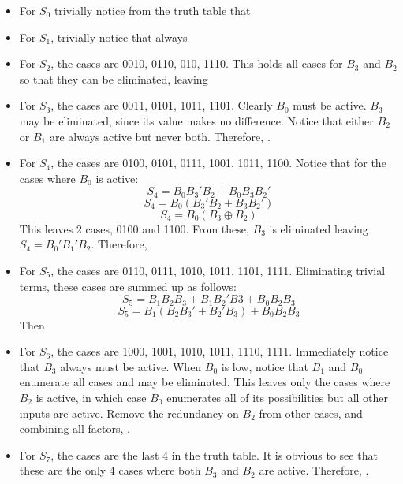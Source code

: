 \documentclass{article}
\begin{document}
\begin{enumerate}
        \begin{itemize}
            \item For $S_0$ trivially notice from the truth table that 
            \item For $S_1$, trivially notice that  always
            \item For $S_2$, the cases are 0010, 0110, 010, 1110. This holds all
            cases for $B_3$ and $B_2$ so that they can be eliminated, leaving
            \item For $S_3$, the cases are 0011, 0101, 1011, 1101. Clearly $B_0$
            must be active. $B_3$ may be eliminated, since its value makes no 
            difference. Notice that either $B_2$ or $B_1$ are always active but
            never both. Therefore, .
            \item For $S_4$, the cases are 0100, 0101, 0111, 1001, 1011, 1100.
            Notice that for the cases where $B_0$ is active:
            \[S_4 = B_0B_3'B_2 + B_0B_3B_2'\]
            \[S_4 = B_0(B_3'B_2+B_3B_2')\]
            \[S_4 = B_0(B_3 \oplus B_2)\]
            This leaves 2 cases, 0100 and 1100. From these, $B_3$ is eliminated
            leaving $S_4 = B_0'B_1'B_2$. Therefore, 
            \item For $S_5$, the cases are 0110, 0111, 1010, 1011, 1101, 1111. 
            Eliminating trivial terms, these cases are summed up as follows:
            \[S_5 = B_1B_2B_3 + B_1B_2'B3 + B_0B_2B_3\]
            \[S_5 = B_1(B_2B_3'+B_2'B_3) + B_0B_2B_3\]
            Then 
            \item For $S_6$, the cases are 1000, 1001, 1010, 1011, 1110, 1111.
            Immediately notice that $B_3$ always must be active. When $B_0$ is 
            low, notice that $B_1$ and $B_0$ enumerate all cases and may be
            eliminated. This leaves only the cases where $B_2$ is active, in 
            which case $B_0$ enumerates all of its possibilities but all other 
            inputs are active. Remove the redundancy on $B_2$ from other cases, 
            and combining all factors, .
            \item For $S_7$, the cases are the last 4 in the truth table. It is 
            obvious to see that these are the only 4 cases where both $B_3$ and
            $B_2$ are active. Therefore, .

\end{itemize}
\end{enumerate}
\end{document}
